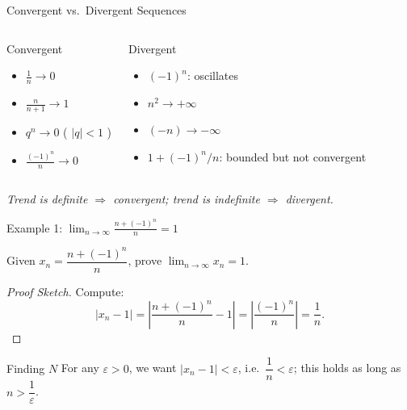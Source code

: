 \documentclass[aspectratio=169,10pt]{beamer}
\begin{document}
\begin{frame}{Convergent vs.\ Divergent Sequences}
  \begin{columns}
    \begin{block}{Convergent}
      \begin{itemize}
        \item $\displaystyle\frac{1}{n}\to 0$
        \item $\displaystyle\frac{n}{n+1}\to 1$
        \item $\displaystyle q^n\to 0$ \;( $|q|<1$ )
        \item $\displaystyle\frac{(-1)^n}{n}\to 0$
      \end{itemize}
    \end{block}
    \begin{alertblock}{Divergent}
      \begin{itemize}
        \item $(-1)^n$: oscillates
        \item $n^2\to+\infty$
        \item $(-n)\to-\infty$
        \item $1+(-1)^n/n$: bounded but not convergent
      \end{itemize}
    \end{alertblock}
  \end{columns}
  \vspace{1em}
  \pause
  \begin{center}
    \textit{Trend is definite $\Rightarrow$ convergent; trend is indefinite $\Rightarrow$ divergent.}
  \end{center}
\end{frame}

\begin{frame}{Example 1: $\displaystyle\lim_{n\to\infty}\frac{n+(-1)^n}{n}=1$}
  \begin{example}
    Given $x_n = \dfrac{n+(-1)^n}{n}$, prove $\displaystyle\lim_{n\to\infty}x_n = 1$.
  \end{example}
  \pause
  \begin{proof}[Proof Sketch]
    Compute:
    \[
      |x_n - 1| = \left|\frac{n+(-1)^n}{n}-1\right| = \left|\frac{(-1)^n}{n}\right| = \frac{1}{n}.
    \]
  \end{proof}
  \pause
  \begin{block}{Finding $N$}
    For any $\varepsilon>0$, we want $|x_n-1|<\varepsilon$, i.e.\ $\dfrac{1}{n}<\varepsilon$; this holds as long as $n > \dfrac{1}{\varepsilon}$.
  \end{block}
\end{frame}
\end{document}
